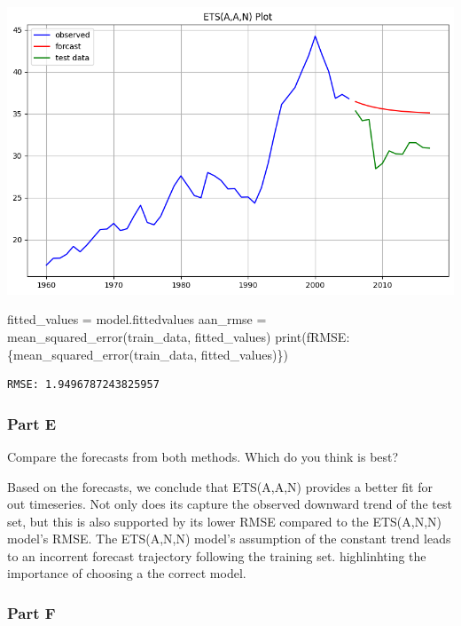 \documentclass[
  11pt,
]{article}
\newenvironment{Shaded}{\begin{snugshade}}{\end{snugshade}}
\newcommand{\BuiltInTok}[1]{\textcolor[rgb]{0.00,0.23,0.31}{#1}}
\newcommand{\NormalTok}[1]{\textcolor[rgb]{0.00,0.23,0.31}{#1}}
\newcommand{\OperatorTok}[1]{\textcolor[rgb]{0.37,0.37,0.37}{#1}}
\newcommand{\SpecialCharTok}[1]{\textcolor[rgb]{0.37,0.37,0.37}{#1}}
\newcommand{\SpecialStringTok}[1]{\textcolor[rgb]{0.13,0.47,0.30}{#1}}
\begin{document}
\includegraphics{hw5_files/figure-pdf/cell-21-output-1.png}

\begin{Shaded}
\begin{Highlighting}[]
\NormalTok{fitted\_values }\OperatorTok{=}\NormalTok{ model.fittedvalues}
\NormalTok{aan\_rmse }\OperatorTok{=}\NormalTok{ mean\_squared\_error(train\_data, fitted\_values)}
\BuiltInTok{print}\NormalTok{(}\SpecialStringTok{f\textquotesingle{}RMSE: }\SpecialCharTok{\{}\NormalTok{mean\_squared\_error(train\_data, fitted\_values)}\SpecialCharTok{\}}\SpecialStringTok{\textquotesingle{}}\NormalTok{)}
\end{Highlighting}
\end{Shaded}

\begin{verbatim}
RMSE: 1.9496787243825957
\end{verbatim}

\subsubsection{Part E}\label{part-e}

Compare the forecasts from both methods. Which do you think is best?

Based on the forecasts, we conclude that ETS(A,A,N) provides a better
fit for out timeseries. Not only does its capture the observed downward
trend of the test set, but this is also supported by its lower RMSE
compared to the ETS(A,N,N) model's RMSE. The ETS(A,N,N) model's
assumption of the constant trend leads to an incorrent forecast
trajectory following the training set. highlinhting the importance of
choosing a the correct model.

\subsubsection{Part F}\label{part-f}
\end{document}
